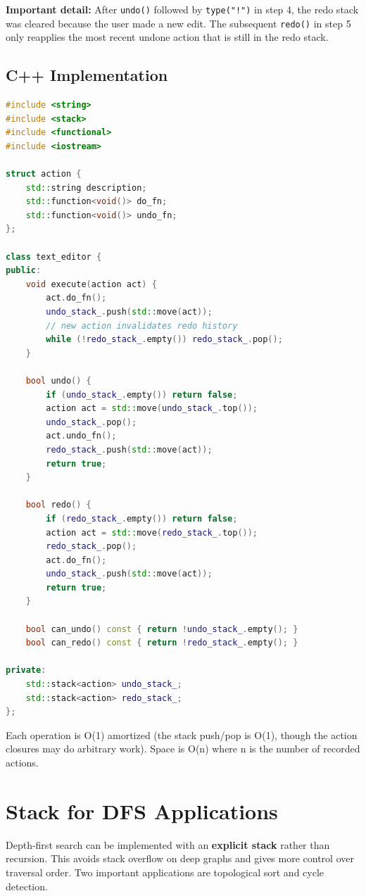 \textbf{Important detail:} After \texttt{undo()} followed by \texttt{type("!")} in step 4, the redo stack was cleared because the user made a new edit. The subsequent \texttt{redo()} in step 5 only reapplies the most recent undone action that is still in the redo stack.

\subsection{C++ Implementation}

\begin{lstlisting}[language=C++]
#include <string>
#include <stack>
#include <functional>
#include <iostream>

struct action {
    std::string description;
    std::function<void()> do_fn;
    std::function<void()> undo_fn;
};

class text_editor {
public:
    void execute(action act) {
        act.do_fn();
        undo_stack_.push(std::move(act));
        // new action invalidates redo history
        while (!redo_stack_.empty()) redo_stack_.pop();
    }

    bool undo() {
        if (undo_stack_.empty()) return false;
        action act = std::move(undo_stack_.top());
        undo_stack_.pop();
        act.undo_fn();
        redo_stack_.push(std::move(act));
        return true;
    }

    bool redo() {
        if (redo_stack_.empty()) return false;
        action act = std::move(redo_stack_.top());
        redo_stack_.pop();
        act.do_fn();
        undo_stack_.push(std::move(act));
        return true;
    }

    bool can_undo() const { return !undo_stack_.empty(); }
    bool can_redo() const { return !redo_stack_.empty(); }

private:
    std::stack<action> undo_stack_;
    std::stack<action> redo_stack_;
};
\end{lstlisting}

Each operation is O(1) amortized (the stack push/pop is O(1), though the action closures may do arbitrary work). Space is O(n) where n is the number of recorded actions.

\section{Stack for DFS Applications}

Depth-first search can be implemented with an \textbf{explicit stack} rather than recursion. This avoids stack overflow on deep graphs and gives more control over traversal order. Two important applications are topological sort and cycle detection.

